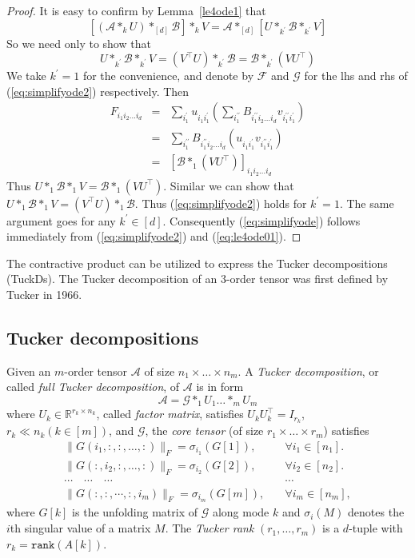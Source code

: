 \documentclass[11pt, oneside]{article}  %
\newcommand{\norm}[1]{\parallel\! #1\! \parallel}
\newcommand{\rank}{\texttt{rank}}
\newcommand{\p}{\prime}
\newcommand{\si}{\sigma}
\newcommand{\RR}{\mathbb{R}}
\newcommand{\A}{\mathcal{A}}
\newcommand{\B}{\mathcal{B}}
\newcommand{\caF}{\mathcal{F}}
\newcommand{\caG}{\mathcal{G}}
\newcommand{\beq}{\begin{equation}}
\newcommand{\eeq}{\end{equation}}
\newcommand{\beyy}{\begin{eqnarray*}}
\newcommand{\eeyy}{\end{eqnarray*}}
\begin{document}
\begin{proof}
It is easy to confirm by Lemma~\ref{le4ode1} that 
\beq\label{eq:le4ode01}  
\left[ (\A\ast_{k} U)\ast_{[d]} \B\right]\ast_{k} V = \A\ast_{[d]} \left[ U\ast_{k^{\p}} \B\ast_{k^{\p}} V \right]
\eeq 
So we need only to show that 
\beq\label{eq:simplifyode2}
U\ast_{k^{\p}} \B\ast_{k^{\p}} V = (V^{\top}U)\ast_{k^{\p}} \B = \B\ast_{k^{\p}} (VU^{\top})
\eeq
We take $k^{\p}=1$ for the convenience, and denote by $\caF$ and $\caG$ for the lhs and rhs of (\ref{eq:simplifyode2}) respectively. Then
\beyy
F_{i_{1}i_{2}\ldots i_{d}} 
&=& \sum_{i^{\p}_{1}} u_{i_{1}i^{\p}_{1}} \left( \sum_{i^{\p\p}_{1}}B_{i^{\p\p}_{1}i_{2}\ldots i_{d}}v_{i^{\p\p}_{1} i^{\p}_{1}}\right) \\
&=& \sum_{i^{\p\p}_{1}} B_{i^{\p\p}_{1}i_{2}\ldots i_{d}}  \left( u_{i_{1}i^{\p}_{1}} v_{i^{\p\p}_{1}i^{\p}_{1}} \right) \\
&=& \left[ \B\ast_{1} (VU^{\top})\right]_{i_{1}i_{2}\ldots i_{d}} 
\eeyy
Thus $U\ast_{1} \B\ast_{1} V = \B\ast_{1} (VU^{\top})$. Similar we can show that $U\ast_{1} \B\ast_{1} V = (V^{\top}U)\ast_{1} \B$. 
Thus (\ref{eq:simplifyode2}) holds for $k^{\p}=1$.  The same argument goes for any $k^{\p}\in [d]$.  Consequently (\ref{eq:simplifyode}) follows immediately from (\ref{eq:simplifyode2}) and (\ref{eq:le4ode01}).  
\end{proof}   

The contractive product can be utilized to express the Tucker decompositions (TuckDs).  The Tucker decomposition of an 3-order tensor was
first defined by Tucker in 1966\cite{Tuck1966}. 

\subsection{Tucker decompositions}
\label{sec2-3}
\setcounter{equation}{0} 

Given an $m$-order tensor $\A$ of size $n_1\times\ldots\times n_m$.  A \emph{Tucker decomposition}, or called \emph{full Tucker 
decomposition}, of $\A$ is in form 
\beq\label{eq2-3-1:tuckD}
\A = \caG\ast_{1}U_{1}\ldots \ast_{m}U_{m}
\eeq
where $U_{k}\in\RR^{r_{k}\times n_{k}}$, called \emph{factor matrix}, satisfies $U_{k}U_{k}^{\top} = I_{r_{k}}$, $r_k\ll n_k (k\in [m])$, 
and $\caG$, the \emph{core tensor} (of size $r_1\times\ldots \times r_m$) satisfies 
\beyy\label{eq:coret}
 \norm{G(i_{1},:,:,\ldots,:)}_{F} =\si_{i_{1}}(G[1]), \quad  &\forall i_{1}\in [n_{1}]. \\
 \norm{G(:,i_{2},:,\ldots,:)}_{F} =\si_{i_{2}}(G[2]), \quad  &\forall i_{2}\in [n_{2}]. \\
  \cdots  \quad   \cdots  \quad  \cdots  \quad   &  \cdots  \\
 \norm{G(:,:,\cdots,:, i_{m})}_{F}=\si_{i_{m}}(G[m]), \quad  &\forall i_{m}\in [n_{m}], 
\eeyy    
where $G[k]$ is the unfolding matrix of $\caG$ along mode $k$ and $\si_{i}(M)$ denotes the $i$th singular value of a matrix $M$.  The 
\emph{Tucker rank} $(r_{1},\ldots, r_{m})$ is a $d$-tuple with $r_{k}=\rank(A[k])$.   
\end{document}
